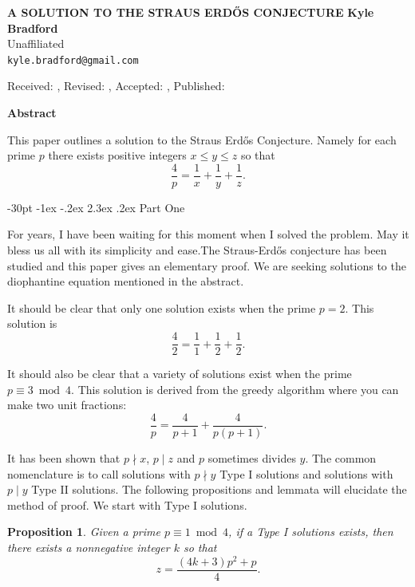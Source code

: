 \documentclass[10pt]{article}
\makeatletter
\renewcommand\section{\@startsection {section}{1}{\z@}
{-30pt \@plus -1ex \@minus -.2ex}
{2.3ex \@plus.2ex}
{\normalfont\normalsize\bfseries\boldmath}}
\newtheorem{proposition}{Proposition}
\theoremstyle{definition}
\makeatother
\begin{document}
\begin{center}
\uppercase{\bf \boldmath A solution to the Straus Erd\H{o}s Conjecture}
\vskip 20pt
{\bf Kyle Bradford}\\
{\smallit Unaffiliated}\\
{\tt kyle.bradford@gmail.com}\\
\end{center}
\vskip 20pt
\centerline{\smallit Received: , Revised: , Accepted: , Published: } %
\vskip 30pt

\centerline{\bf Abstract}
\noindent
This paper outlines a solution to the Straus Erd\H{o}s Conjecture.   Namely for each prime $p$  there exists positive integers $x \leq y \leq z$  so that $$ \frac{4}{p} = \frac{1}{x} + \frac{1}{y} + \frac{1}{z}. $$

\pagestyle{myheadings}
\thispagestyle{empty}
\baselineskip=12.875pt
\vskip 30pt

\section{Part One}

For years, I have been waiting for this moment when I solved the problem.  May it bless us all with its simplicity and ease.The Straus-Erd\H{o}s conjecture has been studied and this paper gives an elementary proof.  We are seeking solutions to the diophantine equation mentioned in the abstract.

It should be clear that only one solution exists when the prime $p=2$.  This solution is $$ \frac{4}{2} = \frac{1}{1} + \frac{1}{2} + \frac{1}{2}.$$

It should also be clear that a variety of solutions exist when the prime $p \equiv 3 \bmod 4$.  This solution is derived from the greedy algorithm where you can make two unit fractions: $$ \frac{4}{p} = \frac{4}{p+1} + \frac{4}{p(p+1)}.$$

It has been shown that $p \nmid x$, $p \mid z$  and $p$  sometimes divides $y$.  The common nomenclature is to call solutions with $p \nmid y$  Type I solutions and solutions with $p \mid y$  Type II solutions.  The following propositions and lemmata will elucidate the method of proof.  We start with Type I solutions.

\begin{proposition}
Given a prime $p \equiv 1 \bmod 4$, if a Type I solutions exists, then there exists a nonnegative integer $k$  so that $$  z= \frac{(4k+3)p^{2}+p}{4}.$$
\end{proposition}
\end{document}
